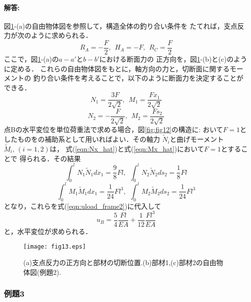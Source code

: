 \documentclass[10pt,a4j]{jarticle}
\begin{document}
\paragraph{解答:}
図\ref{fig:fig13}-(a)の自由物体図を参照して，構造全体の釣り合い条件を
たてれば，支点反力が次のように求められる．
\begin{equation}
	R_A=-\frac{F}{2}, \ \ H_A=-F, \ \ R_C=\frac{F}{2}
	\label{eqn:}
\end{equation}
ここで，図\ref{fig:fig13}-(a)の$a-a'$と$b-b'$における断面力の
正方向を，図\ref{fig:fig13}-(b)と(c)のように定める．
これらの自由物体図をもとに，軸方向の力と，切断面に関するモーメントの
釣り合い条件を考えることで，以下のように断面力を決定することができる．
\begin{equation}
	N_1=\frac{3F}{2\sqrt{2}}, \ \ M_1=\frac{Fx_1}{2\sqrt{2}}
	\label{eqn:Nx_hat}
\end{equation}
\begin{equation}
	N_2=-\frac{F}{2\sqrt{2}}, \ \ M_2=\frac{Fs_2}{2\sqrt{2}}
	\label{eqn:Mx_hat}
\end{equation}
点Bの水平変位を単位荷重法で求める場合，図\ref{fig:fig12}の構造に:
おいて$F=1$としたものをの補助系として用いればよい．その軸力
$\tilde N_i$と曲げモーメント$\tilde M_i,\,(i=1,2)$は，
式(\ref{eqn:Nx_hat})と式(\ref{eqn:Mx_hat})において$F=1$とすることで
得られる．その結果
\begin{equation}
	\int_0^l N_1\tilde N_1dx_1=\frac{9}{8}Fl, \ \ 
	\int_0^l N_2\tilde N_2ds_2=\frac{1}{8}Fl
	\label{eqn:}
\end{equation}
\begin{equation}
	\int_0^l M_1\tilde M_1dx_1=\frac{1}{24}Fl^3, \ \ 
	\int_0^l M_2\tilde M_2ds_2=\frac{1}{24}Fl^3
	\label{eqn:}
\end{equation}
となり，これらを式(\ref{eqn:uload_frame2})に代入して
\begin{equation}
	u_B=\frac{5}{4}\frac{Fl}{EA}
	+
	\frac{1}{12}\frac{Fl^3}{EA}
	\label{eqn:}
\end{equation}
と，水平変位が求められる．
\begin{figure}[h]
	\begin{center}
	\texttt{[image: fig13.eps]} 
	\end{center}
	\caption{(a)支点反力の正方向と部材の切断位置.(b)部材1,(c)部材2の自由物体図(例題2).} 
	\label{fig:fig13}
\end{figure}
\subsubsection{例題3}
\end{document}
